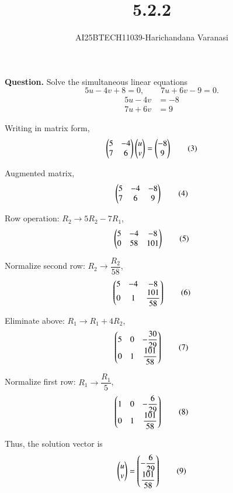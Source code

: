 \documentclass[journal]{IEEEtran}
\title{5.2.2}
\author{AI25BTECH11039-Harichandana Varanasi}
\date{}
\numberwithin{equation}{enumi}
\numberwithin{figure}{enumi}
\begin{document}
\maketitle


\noindent\textbf{Question.}\;
Solve the simultaneous linear equations
\[
5u-4v+8=0,\qquad 7u+6v-9=0 .
\]
\renewcommand\theequation{\arabic{equation}}
\begin{align}
5u - 4v &= -8 \tag{1}\\
7u + 6v &= 9 \tag{2}
\end{align}

Writing in matrix form,
\begin{equation}
\begin{pmatrix}5 & -4 \\ 7 & 6\end{pmatrix}\begin{pmatrix}u \\ v\end{pmatrix}=\begin{pmatrix}-8 \\ 9\end{pmatrix} \tag{3}
\end{equation}

Augmented matrix,
\begin{equation}
\begin{pmatrix}5 & -4 & -8 \\ 7 & 6 & 9\end{pmatrix} \tag{4}
\end{equation}

\noindent Row operation: $R_2 \to 5R_2 - 7R_1$,
\begin{equation}
\begin{pmatrix}5 & -4 & -8 \\ 0 & 58 & 101\end{pmatrix} \tag{5}
\end{equation}

\noindent Normalize second row: $R_2 \to \dfrac{R_2}{58}$,
\begin{equation}
\begin{pmatrix}5 & -4 & -8 \\ 0 & 1 & \dfrac{101}{58}\end{pmatrix} \tag{6}
\end{equation}

\noindent Eliminate above: $R_1 \to R_1 + 4R_2$,
\begin{equation}
\begin{pmatrix}5 & 0 & -\dfrac{30}{29} \\ 0 & 1 & \dfrac{101}{58}\end{pmatrix} \tag{7}
\end{equation}

\noindent Normalize first row: $R_1 \to \dfrac{R_1}{5}$,
\begin{equation}
\begin{pmatrix}1 & 0 & -\dfrac{6}{29} \\ 0 & 1 & \dfrac{101}{58}\end{pmatrix} \tag{8}
\end{equation}

Thus, the solution vector is
\begin{equation}
\begin{pmatrix}u \\ v\end{pmatrix}=\begin{pmatrix}-\dfrac{6}{29} \\ \dfrac{101}{58}\end{pmatrix} \tag{9}
\end{equation}
\end{document}
